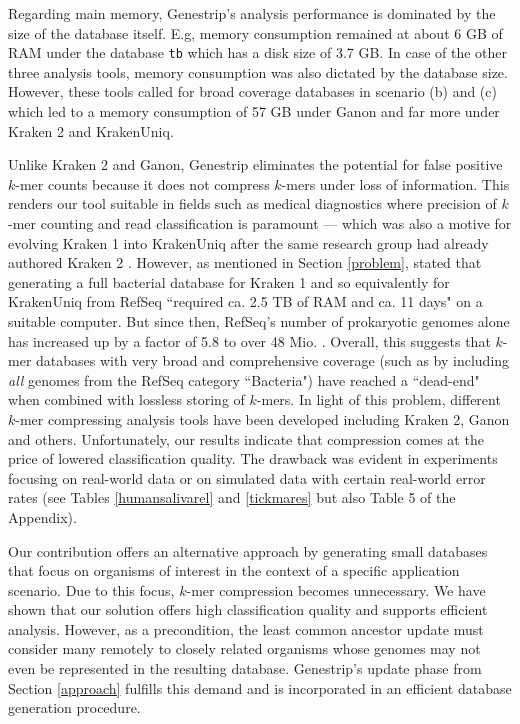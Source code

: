 \documentclass[pdflatex,sn-vancouver-num]{sn-jnl}
\begin{document}
   Regarding main memory, Genestrip's analysis performance is dominated by the size of the database itself. E.g, memory consumption remained at about 6 GB of RAM under the database \texttt{tb} which has a disk size of 3.7 GB. In case of the other three analysis tools, memory consumption was also dictated by the database size. However, these tools called for broad coverage databases in scenario (b) and (c) which led to a memory consumption of 57 GB under Ganon and far more under Kraken 2 and KrakenUniq.
   
    Unlike Kraken 2 and Ganon, Genestrip eliminates the potential for false positive $k$-mer counts because it does not compress $k$-mers under loss of information. This renders our tool suitable in fields such as medical diagnostics where precision of $k$-mer counting and read classification is paramount --- which was also a motive for evolving Kraken 1 into KrakenUniq \citep{lowmemkraken} after the same research group had already authored Kraken 2 \citep{kraken2}. However, as mentioned in Section \ref{problem}, \cite{Nasko:2018aa} stated that generating a full bacterial database for Kraken 1 and so equivalently for KrakenUniq from RefSeq ``required ca. 2.5 TB of RAM and ca. 11 days" on a suitable computer. But since then, RefSeq's number of prokaryotic genomes alone has increased up by a factor of 5.8 to over 48 Mio. \citep{10.1093/nar/gkae1038}. Overall, this suggests that $k$-mer databases with very broad and comprehensive coverage (such as by including \emph{all} genomes from the RefSeq category ``Bacteria") have reached a ``dead-end" when combined with lossless storing of $k$-mers.
    In light of this problem, different $k$-mer compressing analysis tools have been developed including Kraken 2, Ganon and others. Unfortunately, our results indicate that compression comes at the price of lowered classification quality. The drawback was evident in experiments focusing on real-world data or on simulated data with certain real-world error rates (see Tables \ref{humansalivarel} and \ref{tickmares} but also Table 5 %
     of the Appendix).
    
    Our contribution offers an alternative approach by generating small databases that focus on organisms of interest in the context of a specific application scenario. Due to this focus, $k$-mer compression becomes unnecessary. We have shown that our solution offers high classification quality and supports efficient analysis. However, as a precondition, the least common ancestor update must consider many remotely to closely related organisms whose genomes may not even be represented in the resulting database. Genestrip's update phase from Section \ref{approach} fulfills this demand and is incorporated in an efficient database generation procedure.
\end{document}
